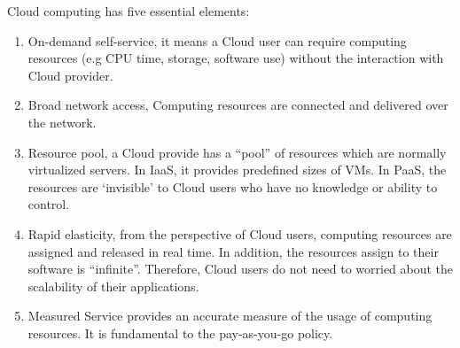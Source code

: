 Cloud computing has five essential elements:
\begin{enumerate}
 \item On-demand self-service, it means a Cloud user can require computing resources (e.g CPU time, storage, software use) without the interaction with Cloud provider.
 \item Broad network access, Computing resources are connected and delivered over the network.
 \item Resource pool, a Cloud provide has a ``pool'' of resources which are normally virtualized servers. In IaaS, it provides predefined sizes of VMs. In PaaS, the resources are `invisible' to Cloud users who have no knowledge or ability to control. 
 \item Rapid elasticity, from the perspective of Cloud users, computing resources are assigned and released in
real time. In addition, the resources assign to their software is ``infinite''. Therefore, Cloud users do not need to worried about the scalability of their applications.
 \item Measured Service provides an accurate measure of the usage of computing resources. It is fundamental to the pay-as-you-go policy.
\end{enumerate}

